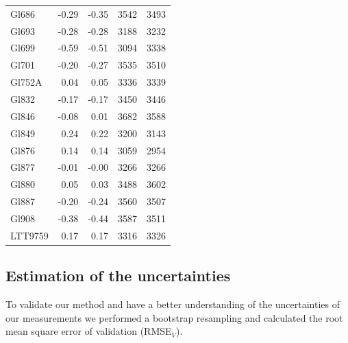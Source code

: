 \documentclass{aa}
\begin{document}
\begin{table}[]
{\begin{tabular}{ l r r r r}
Gl686 & -0.29 & -0.35 & 3542 & 3493 \\
Gl693 & -0.28 & -0.28 & 3188 & 3232 \\
Gl699 & -0.59 & -0.51 & 3094 & 3338 \\
Gl701 & -0.20 & -0.27 & 3535 & 3510 \\
Gl752A & 0.04 & 0.05 & 3336 & 3339 \\
Gl832 & -0.17 & -0.17 & 3450 & 3446 \\
Gl846 & -0.08 & 0.01 & 3682 & 3588 \\
Gl849 & 0.24 & 0.22 & 3200 & 3143 \\
Gl876 & 0.14 & 0.14 & 3059 & 2954 \\
Gl877 & -0.01 & -0.00 & 3266 & 3266 \\
Gl880 & 0.05 & 0.03 & 3488 & 3602 \\
Gl887 & -0.20 & -0.24 & 3560 & 3507 \\
Gl908 & -0.38 & -0.44 & 3587 & 3511 \\
LTT9759 & 0.17 & 0.17 & 3316 & 3326 \\
\hline
\end{tabular}}
\end{table}


\subsection{Estimation of the uncertainties}
\label{sec:uncertain}
To validate our method and have a better understanding of the uncertainties of our measurements we performed a bootstrap resampling and calculated the root mean square error of validation (RMSE$_{V}$). 
\end{document}

